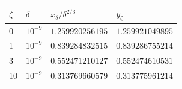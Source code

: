 \begin{center}
\begin{tabular}{@{}llll@{}}
\toprule
\(\zeta\) & \(\delta\) & \(x_\delta/\delta^{2/3}\) & \(y_\zeta\)\\
\midrule
0 & \(10^{-9}\) & \(1.259920256195\) & \(1.259921049895\)\\
1 & \(10^{-9}\) & \(0.839284832515\) & \(0.839286755214\)\\
3 & \(10^{-9}\) & \(0.552471210127\) & \(0.552474610531\)\\
10 & \(10^{-9}\) & \(0.313769660579\) & \(0.313775961214\)\\
\bottomrule
\end{tabular}
\end{center}
